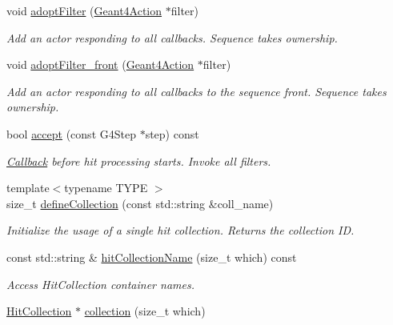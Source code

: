 \begin{DoxyCompactItemize}
void \hyperlink{class_d_d4hep_1_1_simulation_1_1_geant4_sensitive_a54a242570db8df04bcf260d2e0ea3018}{adopt\+Filter} (\hyperlink{class_d_d4hep_1_1_simulation_1_1_geant4_action}{Geant4\+Action} $\ast$filter)
\begin{DoxyCompactList}\small\item\em Add an actor responding to all callbacks. Sequence takes ownership. \end{DoxyCompactList}\item 
void \hyperlink{class_d_d4hep_1_1_simulation_1_1_geant4_sensitive_a923ce4e474920fab8d2c7c6762e82ef4}{adopt\+Filter\+\_\+front} (\hyperlink{class_d_d4hep_1_1_simulation_1_1_geant4_action}{Geant4\+Action} $\ast$filter)
\begin{DoxyCompactList}\small\item\em Add an actor responding to all callbacks to the sequence front. Sequence takes ownership. \end{DoxyCompactList}\item 
bool \hyperlink{class_d_d4hep_1_1_simulation_1_1_geant4_sensitive_ac39e0e8880a309942194e9f1b84af5a1}{accept} (const G4\+Step $\ast$step) const
\begin{DoxyCompactList}\small\item\em \hyperlink{class_d_d4hep_1_1_callback}{Callback} before hit processing starts. Invoke all filters. \end{DoxyCompactList}\item 
{\footnotesize template$<$typename T\+Y\+PE $>$ }\\size\+\_\+t \hyperlink{class_d_d4hep_1_1_simulation_1_1_geant4_sensitive_afd3ff7bc96a59196616058f70eefb1b9}{define\+Collection} (const std\+::string \&coll\+\_\+name)
\begin{DoxyCompactList}\small\item\em Initialize the usage of a single hit collection. Returns the collection ID. \end{DoxyCompactList}\item 
const std\+::string \& \hyperlink{class_d_d4hep_1_1_simulation_1_1_geant4_sensitive_aafc865d1ca6e2120609997e96eb68440}{hit\+Collection\+Name} (size\+\_\+t which) const
\begin{DoxyCompactList}\small\item\em Access Hit\+Collection container names. \end{DoxyCompactList}\item 
\hyperlink{class_d_d4hep_1_1_simulation_1_1_geant4_sensitive_a160ee45c4477c7165b1d56d377e5582f}{Hit\+Collection} $\ast$ \hyperlink{class_d_d4hep_1_1_simulation_1_1_geant4_sensitive_a49d2a794d7824475b7bac71d7342306b}{collection} (size\+\_\+t which)

\end{DoxyCompactItemize}
